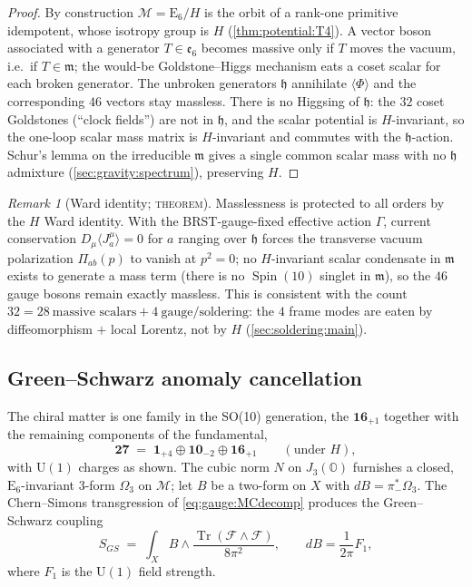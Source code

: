 \documentclass[11pt]{article}
\theoremstyle{plain}
\theoremstyle{definition}
\theoremstyle{remark}
\newtheorem{remark}[theorem]{Remark}
\newcommand{\U}[1]{\mathrm{U}(#1)}
\newcommand{\E}[1]{\mathrm{E}_{#1}}
\newcommand{\Spin}{\operatorname{Spin}}
\newcommand{\Tr}{\operatorname{Tr}}
\newcommand{\Uone}{\U{1}}
\newcommand{\ESix}{\E{6}}
\begin{document}
\begin{proof}
By construction $\mathcal M=\ESix/H$ is the orbit of a rank-one primitive
idempotent, whose isotropy group is $H$ (\autoref{thm:potential:T4}).
A vector boson associated with a generator $T\in\mathfrak e_6$ becomes
massive only if $T$ moves the vacuum, i.e.\ if $T\in\mathfrak m$; the
would-be Goldstone--Higgs mechanism eats a coset scalar for each broken
generator. The unbroken generators $\mathfrak h$ annihilate
$\langle\Phi\rangle$ and the corresponding $46$ vectors stay massless.
There is no Higgsing of $\mathfrak h$: the $32$ coset Goldstones
(``clock fields'') are not in $\mathfrak h$, and the scalar potential is
$H$-invariant, so the one-loop scalar mass matrix is $H$-invariant and
commutes with the $\mathfrak h$-action. Schur's lemma on the irreducible
$\mathfrak m$ gives a single common scalar mass with no $\mathfrak h$
admixture (\autoref{sec:gravity:spectrum}), preserving $H$.
\end{proof}

\begin{remark}[Ward identity; \textsc{theorem}]\label{rem:gauge:ward}
Masslessness is protected to all orders by the $H$ Ward identity. With
the BRST-gauge-fixed effective action $\Gamma$, current conservation
$D_\mu\langle J^{\mu}_{a}\rangle=0$ for $a$ ranging over $\mathfrak h$
forces the transverse vacuum polarization $\Pi_{ab}(p)$ to vanish at
$p^2=0$; no $H$-invariant scalar condensate in $\mathfrak m$ exists to
generate a mass term (there is no $\Spin(10)$ singlet in $\mathfrak m$),
so the $46$ gauge bosons remain exactly massless. This is consistent with
the count $32 = 28\ \text{massive scalars} + 4\ \text{gauge/soldering}$:
the $4$ frame modes are eaten by diffeomorphism $+$ local Lorentz, not by
$H$ (\autoref{sec:soldering:main}).
\end{remark}

\subsection{Green--Schwarz anomaly cancellation}
\label{sec:gauge:gs}

The chiral matter is one family in the SO(10) generation, the
$\mathbf{16}_{+1}$ together with the remaining components of the
fundamental,
\begin{equation}\label{eq:gauge:matter}
  \mathbf{27}
  \;=\;
  \mathbf 1_{+4}\oplus\mathbf{10}_{-2}\oplus\mathbf{16}_{+1}
  \qquad(\text{under }H),
\end{equation}
with $\Uone$ charges as shown. The cubic norm $N$ on $J_3(\mathbb O)$
furnishes a closed, $\ESix$-invariant $3$-form $\Omega_3$ on $\mathcal M$;
let $B$ be a two-form on $X$ with $dB=\pi_-^{*}\Omega_3$. The
Chern--Simons transgression of \eqref{eq:gauge:MCdecomp} produces the
Green--Schwarz coupling
\begin{equation}\label{eq:gauge:GS}
  S_{GS}
  \;=\;
  \int_{X} B\wedge\frac{\Tr(\mathcal F\wedge\mathcal F)}{8\pi^{2}},
  \qquad
  dB=\frac{1}{2\pi}F_{1},
\end{equation}
where $F_1$ is the $\Uone$ field strength.
\end{document}
